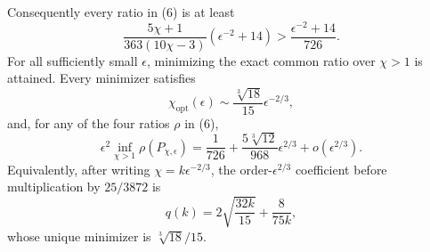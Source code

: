 Consequently every ratio in (6) is at least
\[
 \frac{5\chi+1}{363(10\chi-3)}(\epsilon^{-2}+14)
 >\frac{\epsilon^{-2}+14}{726}.                            \tag{7}
\]
For all sufficiently small \(\epsilon\), minimizing the exact common ratio over \(\chi>1\) is attained.  Every minimizer satisfies
\[
 \chi_{\mathrm{opt}}(\epsilon)
 \sim\frac{\sqrt[3]{18}}{15}\epsilon^{-2/3},              \tag{8}
\]
and, for any of the four ratios \(\rho\) in (6),
\[
 \epsilon^2\inf_{\chi>1}\rho(P_{\chi,\epsilon})
 =\frac1{726}+\frac{5\sqrt[3]{12}}{968}\epsilon^{2/3}
 +o(\epsilon^{2/3}).                                      \tag{9}
\]
Equivalently, after writing \(\chi=k\epsilon^{-2/3}\), the order-\(\epsilon^{2/3}\) coefficient before multiplication by \(25/3872\) is
\[
 q(k)=2\sqrt{\frac{32k}{15}}+\frac8{75k},
\]
whose unique minimizer is \(\sqrt[3]{18}/15\).